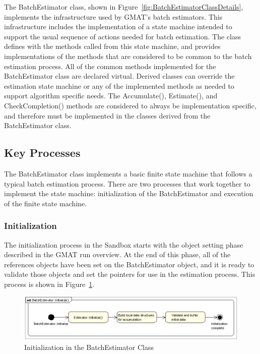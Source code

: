 The BatchEstimator class, shown in Figure~\ref{fig:BatchEstimatorClassDetails}, implements the infrastructure used by GMAT's batch estimators.  This infrastructure includes the implementation of a state machine intended to support the usual sequence of actions needed for batch estimation. The class defines with the methods called from this state machine, and provides implementations of the methods that are considered to be common to the batch estimation process.  All of the common methods implemented for the BatchEstimator class are declared virtual.  Derived classes can override the estimation state machine or any of the implemented methods as needed to support algorithm specific needs.  The Accumulate(), Estimate(), and CheckCompletion() methods are considered to always be implementation specific, and therefore must be implemented in the classes derived from the BatchEstimator class.

\subsection{Key Processes}

The BatchEstimator class implements a basic finite state machine that follows a typical batch estimation process.  There are two processes that work together to implement the state machine: initialization of the BatchEstimator and execution of the finite state machine.

\subsubsection{Initialization}

The initialization process in the Sandbox starts with the object setting phase described in the GMAT run overview.  At the end of this phase, all of the references objects have been set on the BatchEstimator object, and it is ready to validate those objects and set the pointers for use in the estimation process.  This process is shown in Figure~\ref{fig:BatchEstimatorInitialize}.

\begin{figure}[htbp]
\begin{center}
\includegraphics[scale=0.6]{Images/BatchEstimatorInitialize.eps}
\caption{\label{fig:BatchEstimatorInitialize}Initialization in the BatchEstimator Class}
\end{center}
\end{figure}

